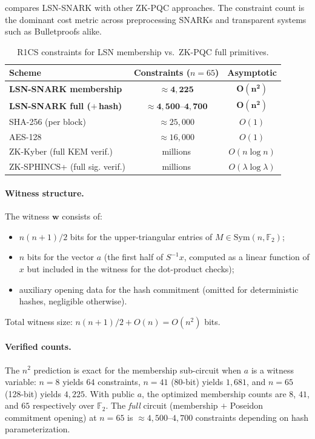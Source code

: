 \documentclass[11pt,a4paper]{article}
\theoremstyle{plain}
\theoremstyle{definition}
\newcommand{\F}{\mathbb{F}}
\begin{document}
 compares LSN-SNARK with other ZK-PQC approaches. The constraint count is the dominant cost metric across preprocessing SNARKs \cite{GGPR13,Gro16} and transparent systems such as Bulletproofs \cite{BBB+18} alike.

\begin{table}[ht]
\centering
\caption{R1CS constraints for LSN membership vs.~ZK-PQC full primitives.}
\label{tab:r1cs}
{\small\begin{tabular}{@{}lcc@{}}
\hline
Scheme & Constraints ($n=65$) & Asymptotic \\
\hline
\textbf{LSN-SNARK membership} & $\mathbf{\approx 4{,}225}$ & $\mathbf{O(n^2)}$ \\
\textbf{LSN-SNARK full ($+\,$hash)} & $\mathbf{\approx 4{,}500}$--$\mathbf{4{,}700}$ & $\mathbf{O(n^2)}$ \\
SHA-256 (per block) & $\approx 25{,}000$ & $O(1)$ \\
AES-128 & $\approx 16{,}000$ & $O(1)$ \\
ZK-Kyber (full KEM verif.) & millions & $O(n \log n)$ \\
ZK-SPHINCS+ (full sig. verif.) & millions & $O(\lambda \log \lambda)$ \\
\hline
\end{tabular}}
\end{table}

\paragraph{Witness structure.} The witness $\mathbf{w}$ consists of:
\begin{itemize}
\item $n(n+1)/2$ bits for the upper-triangular entries of $M \in \mathrm{Sym}(n,\F_2)$;
\item $n$ bits for the vector $a$ (the first half of $S^{-1}x$, computed as a linear function of $x$ but included in the witness for the dot-product checks);
\item auxiliary opening data for the hash commitment (omitted for deterministic hashes, negligible otherwise).
\end{itemize}
Total witness size: $n(n+1)/2 + O(n) = O(n^2)$ bits.

\paragraph{Verified counts.}
The $n^2$ prediction is exact for the membership sub-circuit when $a$ is a witness variable: $n=8$ yields $64$ constraints, $n=41$ (80-bit) yields $1{,}681$, and $n=65$ (128-bit) yields $4{,}225$. With public $a$, the optimized membership counts are $8$, $41$, and $65$ respectively over $\F_2$. The \emph{full} circuit (membership $+$ Poseidon commitment opening) at $n=65$ is $\approx 4{,}500$--$4{,}700$ constraints depending on hash parameterization.
\end{document}
